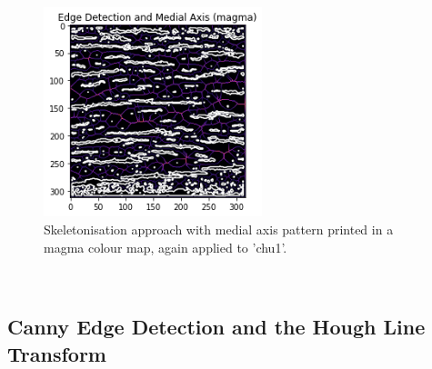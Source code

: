 \documentclass{article}
\begin{document}
	\begin{figure}[h]
		\centering
		\includegraphics[width=2.5in]{Figures/Medial_Axis_Chu1} 
		\caption{Skeletonisation approach with medial axis pattern printed in a magma colour map, again applied to 'chu1'.}
		\label{MedialAxis}
	\end{figure}
	\\
	\subsection{Canny Edge Detection and the Hough Line Transform}
	
\end{document}

